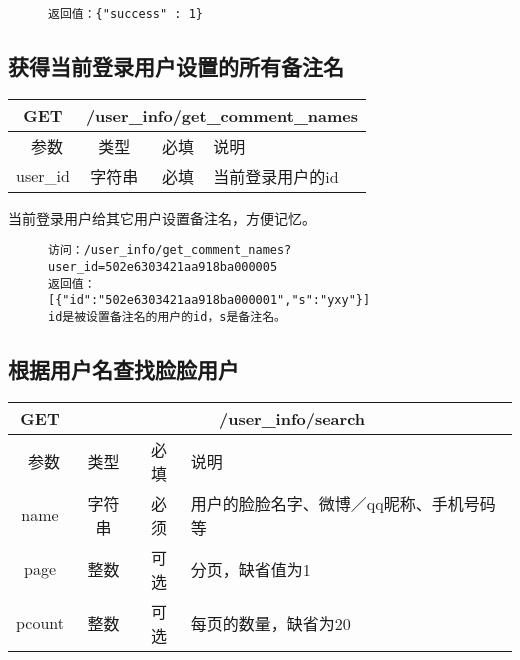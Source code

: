 \begin{figure}[H]
\begin{verbatim}
返回值：{"success" : 1}
\end{verbatim}
\end{figure}


\subsection{获得当前登录用户设置的所有备注名}

\begin{table}[H]
   \begin{center}
\begin{tabular}{|c|c|c|p{12cm}|}
\hline
GET & \multicolumn{3}{|c|}{/user\_info/get\_comment\_names} \\
\hline\hline
 \  参数  & 类型 & 必填 &  说明  \\
\hline
 user\_id  & 字符串 & 必填 &  当前登录用户的id\\
\hline
\end{tabular}
   \end{center}
\end{table}
当前登录用户给其它用户设置备注名，方便记忆。

\begin{figure}[H]
\begin{verbatim}
访问：/user_info/get_comment_names?user_id=502e6303421aa918ba000005
返回值：
[{"id":"502e6303421aa918ba000001","s":"yxy"}]
id是被设置备注名的用户的id，s是备注名。
\end{verbatim}
\end{figure}


\subsection{根据用户名查找脸脸用户}

\begin{table}[H]
   \begin{center}
\begin{tabular}{|c|c|c|p{12cm}|}
\hline
GET & \multicolumn{3}{|c|}{/user\_info/search} \\
\hline\hline
 \  参数  & 类型 & 必填 &  说明  \\
  \hline
 name  & 字符串 & 必须 & 用户的脸脸名字、微博／qq昵称、手机号码等\\ 
\hline
 page  & 整数 & 可选 & 分页，缺省值为1\\ 
 \hline
 pcount  & 整数 & 可选 & 每页的数量，缺省为20\\ 
\hline
\end{tabular}
   \end{center}
\end{table}

